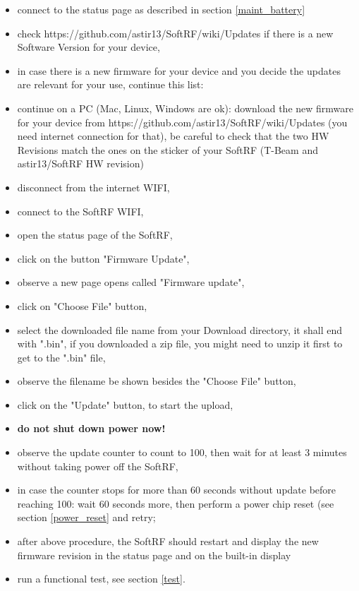\documentclass[11pt,a4paper]{article}
\begin{document}
\begin{itemize}
\item connect to the status page as described in section \ref{maint_battery}
\item check https://github.com/astir13/SoftRF/wiki/Updates if there is a new Software Version for your device,
\item in case there is a new firmware for your device and you decide the updates are relevant for your use, continue this list:
\item continue on a PC (Mac, Linux, Windows are ok): download the new firmware for your device from https://github.com/astir13/SoftRF/wiki/Updates (you need internet connection for that), be careful to check that the two HW Revisions match the ones on the sticker of your SoftRF (T-Beam and astir13/SoftRF HW revision)
\item disconnect from the internet WIFI,
\item connect to the SoftRF WIFI,
\item open the status page of the SoftRF,
\item click on the button "Firmware Update",
\item observe a new page opens called "Firmware update",
\item click on "Choose File" button,
\item select the downloaded file name from your Download directory, it shall end with ".bin", if you downloaded a zip file, you might need to unzip it first to get to the ".bin" file,
\item observe the filename be shown besides the "Choose File" button,
\item click on the "Update" button, to start the upload,
\item {\bf do not shut down power now!}
\item observe the update counter to count to 100, then wait for at least 3 minutes without taking power off the SoftRF,
\item in case the counter stops for more than 60 seconds without update before reaching 100: wait 60 seconds more, then perform a power chip reset (see section \ref{power_reset} and retry;
\item after above procedure, the SoftRF should restart and display the new firmware revision in the status page and on the built-in display
\item run a functional test, see section \ref{test}.

\end{itemize}
\end{document}
